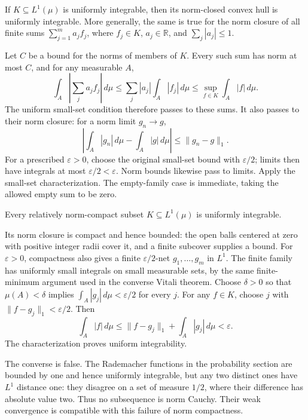 \begin{proposition}
If $K\subseteq L^1(\mu)$ is uniformly integrable, then its norm-closed
convex hull is uniformly integrable. More generally, the same is true
for the norm closure of all finite sums $\sum_{j=1}^m a_jf_j$, where
$f_j\in K$, $a_j\in\mathbb R$, and $\sum_j|a_j|\leqslant1$.
\end{proposition}
\Proof
Let $C$ be a bound for the norms of members of $K$. Every such sum has
norm at most $C$, and for any measurable $A$,
\[
\int_A\left|\sum_j a_jf_j\right|\,d\mu
 \leqslant\sum_j|a_j|\int_A|f_j|\,d\mu
 \leqslant\sup_{f\in K}\int_A|f|\,d\mu.
\]
The uniform small-set condition therefore passes to these sums.
It also passes to their norm closure: for a norm limit $g_n\to g$,
\[
\left|\int_A|g_n|\,d\mu-\int_A|g|\,d\mu\right|
\leqslant\|g_n-g\|_1.
\]
For a prescribed $\varepsilon>0$, choose the original small-set bound
with $\varepsilon/2$; limits then have integrals at most
$\varepsilon/2<\varepsilon$. Norm bounds likewise pass to limits.
Apply the small-set characterization. The empty-family case is
immediate, taking the allowed empty sum to be zero.
\Done

\begin{proposition}
Every relatively norm-compact subset $K\subseteq L^1(\mu)$ is
uniformly integrable.
\end{proposition}
\Proof
Its norm closure is compact and hence bounded: the open balls centered
at zero with positive integer radii cover it, and a finite subcover
supplies a bound. For $\varepsilon>0$, compactness also gives a finite
$\varepsilon/2$-net $g_1,\ldots,g_m$ in $L^1$. The finite family has
uniformly small integrals on small measurable sets, by the same
finite-minimum argument used in the converse Vitali theorem. Choose
$\delta>0$ so that $\mu(A)<\delta$ implies
$\int_A|g_j|\,d\mu<\varepsilon/2$ for every $j$. For any $f\in K$,
choose $j$ with $\|f-g_j\|_1<\varepsilon/2$. Then
\[
\int_A|f|\,d\mu\leqslant\|f-g_j\|_1+\int_A|g_j|\,d\mu
<\varepsilon.
\]
The characterization proves uniform integrability.
\Done

The converse is false. The Rademacher functions in the probability
section are bounded by one and hence uniformly integrable, but any
two distinct ones have $L^1$ distance one: they disagree on a set of
measure $1/2$, where their difference has absolute value two. Thus
no subsequence is norm Cauchy. Their weak convergence is compatible
with this failure of norm compactness.

